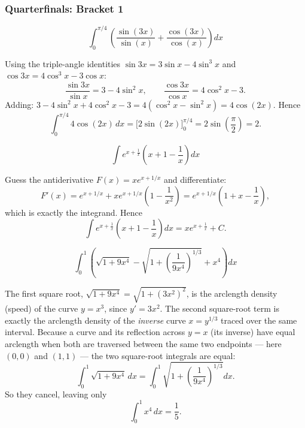 \subsubsection*{Quarterfinals: Bracket 1}
\begin{questions}

\question \[\int_0^{\pi/4} \left(\frac{\sin(3x)}{\sin(x)}+\frac{\cos(3x)}{\cos(x)}\right)dx\]
\begin{solution}
Using the triple-angle identities $\sin3x=3\sin x-4\sin^3x$ and $\cos3x=4\cos^3x-3\cos x$:
\[
\frac{\sin3x}{\sin x}=3-4\sin^2x,\qquad \frac{\cos3x}{\cos x}=4\cos^2x-3.
\]
Adding: $3-4\sin^2x+4\cos^2x-3=4(\cos^2x-\sin^2x)=4\cos(2x)$. Hence
\[
\int_0^{\pi/4}4\cos(2x)\,dx=\Big[2\sin(2x)\Big]_0^{\pi/4}=2\sin\!\left(\frac\pi2\right)=2.
\]
\end{solution}

\question \[\int e^{x+\frac1x}\left(x+1-\frac1x\right)dx\]
\begin{solution}
Guess the antiderivative $F(x)=xe^{x+1/x}$ and differentiate:
\[
F'(x)=e^{x+1/x}+x e^{x+1/x}\left(1-\frac{1}{x^2}\right)=e^{x+1/x}\left(1+x-\frac1x\right),
\]
which is exactly the integrand. Hence
\[
\int e^{x+\frac1x}\left(x+1-\frac1x\right)dx=xe^{x+\frac1x}+C.
\]
\end{solution}

\question \[\int_0^1 \left(\sqrt{1+9x^4}-\sqrt{1+\left(\frac{1}{9x^4}\right)^{1/3}}+x^4\right)dx\]
\begin{solution}
The first square root, $\sqrt{1+9x^4}=\sqrt{1+(3x^2)^2}$, is the arclength density (speed) of the curve $y=x^3$, since $y'=3x^2$. The second square-root term is exactly the arclength density of the \emph{inverse} curve $x=y^{1/3}$ traced over the same interval. Because a curve and its reflection across $y=x$ (its inverse) have equal arclength when both are traversed between the same two endpoints — here $(0,0)$ and $(1,1)$ — the two square-root integrals are equal:
\[
\int_0^1\sqrt{1+9x^4}\,dx=\int_0^1\sqrt{1+\left(\frac1{9x^4}\right)^{1/3}}dx.
\]
So they cancel, leaving only
\[
\int_0^1 x^4\,dx=\frac15.
\]
\end{solution}

\end{questions}

